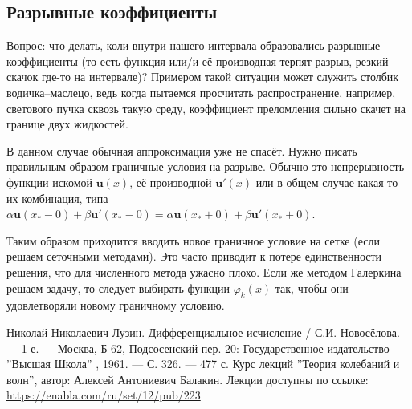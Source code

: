 \documentclass[a4paper,9pt,russian]{article}
\begin{document}
\subsection{Разрывные коэффициенты}
    Вопрос: что делать, коли внутри нашего интервала образовались разрывные коэффициенты (то есть {функция или/и её производная терпят разрыв, резкий скачок где-то на интервале})? Примером такой ситуации может служить столбик водичка--маслецо, ведь когда пытаемся просчитать распространение, например, светового пучка сквозь такую среду, коэффициент преломления сильно скачет на границе двух жидкостей.\par
    {В данном случае} обычная аппроксимация уже не спасёт. {Нужно писать правильным образом граничные условия на разрыве}. Обычно это непрерывность функции искомой $\boldsymbol u(x)$, её производной $\boldsymbol u'(x)$ или {в общем случае какая-то их комбинация, типа $\alpha \boldsymbol u(x_* - 0) + \beta \boldsymbol u'(x_* - 0) =\alpha \boldsymbol u(x_* + 0) + \beta \boldsymbol u'(x_* + 0)$.}\par
    Таким образом приходится вводить новое граничное условие на сетке (если решаем сеточными методами). Это часто приводит к потере единственности решения, что для численного метода ужасно плохо. Если же методом Галеркина решаем задачу, то следует выбирать функции $\varphi_k(x)$ так, чтобы они удовлетворяли новому граничному условию.
    
    \begin{thebibliography}{1}
     Николай Николаевич Лузин. Дифференциальное исчисление / С.И. Новосёлова. — 1-е. — Москва, Б-62, Подсосенский пер. 20: Государственное издательство ''Высшая Школа'' , 1961. — С. 326. — 477 с.
     Курс лекций ''Теория колебаний и волн'', автор: Алексей Антониевич Балакин. Лекции доступны по ссылке:\\
     \url{https://enabla.com/ru/set/12/pub/223}
    \end{thebibliography}
\end{document}
